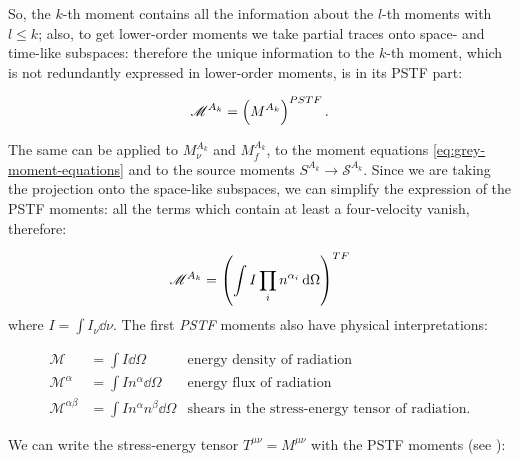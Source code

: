 \documentclass[main.tex]{subfiles}
\begin{document}
So, the \(k\)-th moment contains all the information about the \(l\)-th moments with \(l\leq k\); also, to get lower-order moments we take partial traces onto space- and time-like subspaces: therefore the unique information to the \(k\)-th moment, which is not redundantly expressed in lower-order moments, is in its PSTF part:

\begin{equation}
  \mathscr M ^{A_k} = \qty(M^{A_k}) ^{PSTF} \,.
\end{equation}

The same can be applied to \(M^{A_k}_\nu\) and \(M^{A_k}_f\), to the moment equations \eqref{eq:grey-moment-equations} and to the source moments \(S^{A_k} \rightarrow \mathscr S ^{A_k}\). Since we are taking the projection onto the space-like subspaces, we can simplify the expression of the PSTF moments: all the terms which contain at least a four-velocity vanish, therefore:

\begin{equation} \label{eq:trace-free-moments-definition}
  \mathscr M^{A_k} = \qty(\int I \prod_i n^{\alpha_i} \dd{\Omega})^{TF}
\end{equation}
where \(I = \int I_\nu \dd{\nu}\).
The first \emph{PSTF} moments also have physical interpretations:

\begin{subequations}
\begin{align}
   \mathscr M &= \int  I \dd{\Omega}    & \text{energy density of radiation}  \\
   \mathscr M^\alpha &= \int I n^\alpha\dd{\Omega}  & \text{energy flux of radiation}  \\
   \mathscr M^{\alpha\beta} &= \int I n^\alpha n^\beta \dd{\Omega}   & \text{shears in the stress-energy tensor of radiation.}
\end{align}
\end{subequations}

We can write the stress-energy tensor \(T^{\mu\nu} = M^{\mu\nu}\) with the PSTF moments (see \cite[eq. 4.9]{Thorne:1981feb}):
\end{document}
